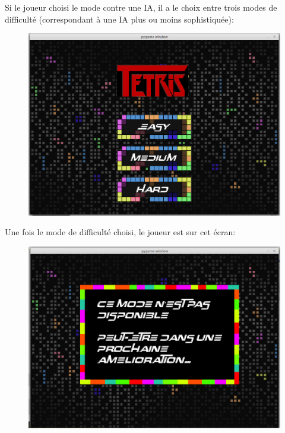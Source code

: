 \documentclass[a4paper, 11pt]{article}
\begin{document}
            \newpage
            Si le joueur choisi le mode contre une IA, il a le choix entre trois modes de difficulté (correspondant à une IA plus ou moins sophistiquée): 
            
            
            \begin{figure}[ht]
                \centering
                \includegraphics[scale=0.25]{images/jeuDiff.png}
            \end{figure}
            
            
            Une fois le mode de difficulté choisi, le joueur est sur cet écran: 
            
            \begin{figure}[ht]
                \centering
                \includegraphics[scale=0.25]{images/jeuAme.png}
            \end{figure}
            
\end{document}
